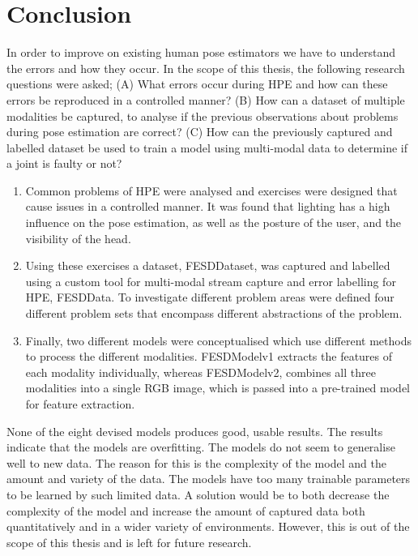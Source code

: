 \chapter{Conclusion}
\label{sec:conclusion}

In order to improve on existing human pose estimators we have to understand the errors and how they occur. In the scope of this thesis, the following research questions were asked; (A) What errors occur during HPE and how can these errors be reproduced in a controlled manner? (B) How can a dataset of multiple modalities be captured, to analyse if the previous observations about problems during pose estimation are correct? (C) How can the previously captured and labelled dataset be used to train a model using multi-modal data to determine if a joint is faulty or not? 

\begin{enumerate}[label=\Alph*]
  \item Common problems of HPE were analysed and exercises were designed that cause issues in a controlled manner. It was found that lighting has a high influence on the pose estimation, as well as the posture of the user, and the visibility of the head.
  \item Using these exercises a dataset, FESDDataset, was captured and labelled using a custom tool for multi-modal stream capture and error labelling for HPE, FESDData. To investigate different problem areas were defined four different problem sets that encompass different abstractions of the problem. 
  \item Finally, two different models were conceptualised which use different methods to process the different modalities. FESDModelv1 extracts the features of each modality individually, whereas FESDModelv2, combines all three modalities into a single RGB image, which is passed into a pre-trained model for feature extraction.
\end{enumerate}

None of the eight devised models produces good, usable results. The results indicate that the models are overfitting. The models do not seem to generalise well to new data. The reason for this is the complexity of the model and the amount and variety of the data. The models have too many trainable parameters to be learned by such limited data. A solution would be to both decrease the complexity of the model and increase the amount of captured data both quantitatively and in a wider variety of environments. However, this is out of the scope of this thesis and is left for future research.

